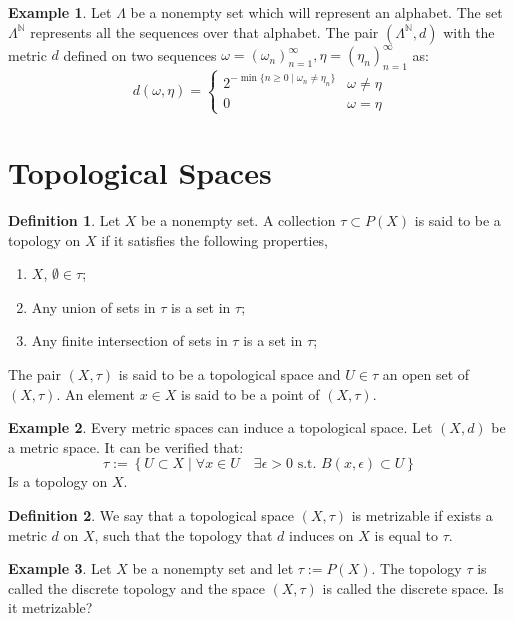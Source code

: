 \documentclass[11pt,a4paper]{article}
\theoremstyle{definition}
\newtheorem{definition}{Definition}[section]
\newtheorem{example}{Example}[section]
\theoremstyle{plain}
\newcommand{\N}{\mathbb{N}}
\newcommand{\st}{\text{ s.t. }}
\newcommand{\set}[2]{ \left\{ #1 \mid #2 \right\} }
\begin{document}
	\begin{example}
	Let $\Lambda$ be a nonempty set which will represent an alphabet.
	The set $\Lambda^{\N}$ represents all the sequences over that alphabet.
	The pair $(\Lambda^\N, d)$ with the metric $d$ defined on two sequences
	$\omega = (\omega_n)_{n=1}^{\infty}, \eta = (\eta_n)_{n=1}^{\infty}$
	as:
	\[
		d(\omega, \eta) = \begin{cases}
			2^{-\min\{n \geq 0 \mid \omega_n \neq \eta_n\}} & 
			\omega \neq \eta \\
			0 & \omega = \eta
		\end{cases}
	\]
	\end{example}
	
	\newpage
	
	\section{Topological Spaces}
	\begin{definition}
		Let $X$ be a nonempty set. A collection $\tau \subset P(X)$ is said to
		be a topology on $X$ if it satisfies the following properties,
		\begin{enumerate}
			\item $X$, $\emptyset \in \tau$;
			\item Any union of sets in $\tau$ is a set in $\tau$;
			\item Any finite intersection of sets in $\tau$ is a set in $\tau$;
		\end{enumerate}
		The pair $(X,\tau)$ is said to be a topological space and $U \in \tau$
		an open set of $(X,\tau)$. An element $x \in X$ is said to be a point
		of $(X,\tau)$.
	\end{definition}
	\begin{example}
		Every metric spaces can induce a topological space. Let $(X,d)$ be a
		metric space. It can be verified that:
		\[
			\tau := \set{U \subset X}{\forall x \in U \quad \exists \epsilon > 0
			\st B(x,\epsilon) \subset U}
		\]
		Is a topology on $X$.
	\end{example}
	\begin{definition}
		We say that a topological space $(X,\tau)$ is metrizable if exists a 
		metric $d$ on $X$, such that the topology that $d$ induces on $X$
		is equal to $\tau$.
	\end{definition}
	\begin{example}
		Let $X$ be a nonempty set and let $\tau := P(X)$. The topology $\tau$
		is called the discrete topology and the space $(X,\tau)$ is called the 
		discrete space. Is it metrizable?
	\end{example}
\end{document}
